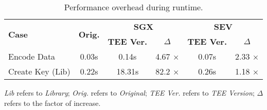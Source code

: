 \begin{table}[htb]
\centering
\caption{Performance overhead during runtime.}
\label{tab:time_run}
\begin{threeparttable}
\begin{tabular}{lccccc}
\toprule[1.5pt]
\multirow{2}{*}{\textbf{Case}} & \multirow{2}{*}{\textbf{Orig.}} & \multicolumn{2}{c}{\textbf{SGX}} & \multicolumn{2}{c}{\textbf{SEV}} \\ 
\cmidrule(lr){3-4} \cmidrule(lr){5-6}
&  & \textbf{TEE Ver.} & \textbf{$\Delta$}  & \textbf{TEE Ver.} & \textbf{$\Delta$} \\
\midrule[0.8pt]
Encode Data & 0.03s  & 0.14s & 4.67 $\times$  & 0.07s & 2.33 $\times$ \\ 
Create Key (Lib) & 0.22s  & 18.31s & 82.2 $\times$  & 0.26s & 1.18 $\times$ \\ 
\bottomrule[1.5pt]
\end{tabular}
\begin{tablenotes}
    \small
    \item \textit{Lib} refers to \textit{Library};
    \textit{Orig.} refers to \textit{Original};
    \textit{TEE Ver.} refers to \textit{TEE Version};
    \textit{$\Delta$} refers to the factor of increase.
\end{tablenotes}
\end{threeparttable}
\end{table}